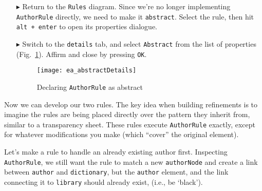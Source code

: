 \begin{itemize}

\item[$\blacktriangleright$] Return to the \texttt{Rules} diagram. Since we're no longer implementing \texttt{AuthorRule} directly, we need to make it
\texttt{abstract}. Select the rule, then hit \texttt{alt + enter} to open its properties dialogue.

\item[$\blacktriangleright$] Switch to the \texttt{details} tab, and select \texttt{Abstract} from the list of properties (Fig.~\ref{ea:abstractDetails}). 
Affirm and close by pressing \texttt{OK}.

\begin{figure}[htbp]
\begin{center}
  \texttt{[image: ea\_abstractDetails]}
  \caption{Declaring \texttt{AuthorRule} as abstract}
  \label{ea:abstractDetails}
\end{center}
\end{figure}

\end{itemize}

Now we can develop our two rules. The key idea when building refinements is to imagine the rules are being placed directly over the pattern they inherit from,
similar to a transparency sheet. These rules execute \texttt{AuthorRule} exactly, except for whatever modifications you make (which ``cover'' the original
element).

Let's make a rule to handle an already existing author first. Inspecting \texttt{AuthorRule}, we still want the rule to match a new \texttt{authorNode}
and create a link between \texttt{author} and \texttt{dictionary}, but the \texttt{author} element, and the link connecting it to \texttt{library} should
already exist, (i.e., be `black').

